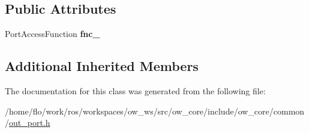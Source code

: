 \subsection*{Public Attributes}
\begin{DoxyCompactItemize}
\item 
Port\+Access\+Function {\bfseries fnc\+\_\+}\hypertarget{classow_1_1OutPort_a7a51fcc8f9904527043a5c12dcdf48d4}{}\label{classow_1_1OutPort_a7a51fcc8f9904527043a5c12dcdf48d4}

\end{DoxyCompactItemize}
\subsection*{Additional Inherited Members}


The documentation for this class was generated from the following file\+:\begin{DoxyCompactItemize}
\item 
/home/flo/work/ros/workspaces/ow\+\_\+ws/src/ow\+\_\+core/include/ow\+\_\+core/common/\hyperlink{out__port_8h}{out\+\_\+port.\+h}\end{DoxyCompactItemize}
